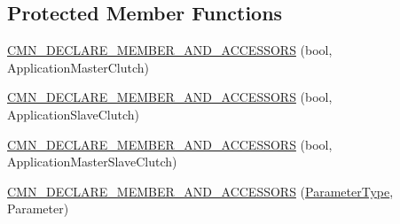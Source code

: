\subsection*{Protected Member Functions}
\begin{DoxyCompactItemize}
\item 
\hyperlink{classrob_collaborative_control_force_a36739c1857854db3e7269fa7a66ad793}{C\-M\-N\-\_\-\-D\-E\-C\-L\-A\-R\-E\-\_\-\-M\-E\-M\-B\-E\-R\-\_\-\-A\-N\-D\-\_\-\-A\-C\-C\-E\-S\-S\-O\-R\-S} (bool, Application\-Master\-Clutch)
\item 
\hyperlink{classrob_collaborative_control_force_a7ac059710c9685998a1696b466af1a39}{C\-M\-N\-\_\-\-D\-E\-C\-L\-A\-R\-E\-\_\-\-M\-E\-M\-B\-E\-R\-\_\-\-A\-N\-D\-\_\-\-A\-C\-C\-E\-S\-S\-O\-R\-S} (bool, Application\-Slave\-Clutch)
\item 
\hyperlink{classrob_collaborative_control_force_a0f48335dfe86d69b7446cc78422cbd78}{C\-M\-N\-\_\-\-D\-E\-C\-L\-A\-R\-E\-\_\-\-M\-E\-M\-B\-E\-R\-\_\-\-A\-N\-D\-\_\-\-A\-C\-C\-E\-S\-S\-O\-R\-S} (bool, Application\-Master\-Slave\-Clutch)
\item 
\hyperlink{classrob_collaborative_control_force_a3f47e2f6039e766e96f092675abe5ef7}{C\-M\-N\-\_\-\-D\-E\-C\-L\-A\-R\-E\-\_\-\-M\-E\-M\-B\-E\-R\-\_\-\-A\-N\-D\-\_\-\-A\-C\-C\-E\-S\-S\-O\-R\-S} (\hyperlink{classrob_collaborative_control_force_1_1_parameter_type}{Parameter\-Type}, Parameter)
\end{DoxyCompactItemize}
